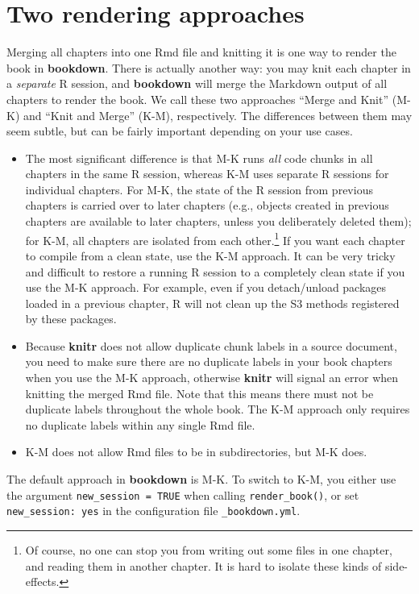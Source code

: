\documentclass[
  12pt,
]{krantz}
\providecommand{\tightlist}{%
  \setlength{\itemsep}{0pt}\setlength{\parskip}{0pt}}
\theoremstyle{definition}
\theoremstyle{definition}
\theoremstyle{definition}
\theoremstyle{definition}
\theoremstyle{remark}
\begin{document}
\section{Two rendering approaches}\label{new-session}

Merging all chapters into one Rmd file and knitting it is one way to render the book in \textbf{bookdown}. There is actually another way: you may knit each chapter in a \emph{separate} R session, and \textbf{bookdown} will merge the Markdown output of all chapters to render the book. We call these two approaches ``Merge and Knit'' (M-K) and ``Knit and Merge'' (K-M), respectively. The differences between them may seem subtle, but can be fairly important depending on your use cases.

\begin{itemize}
\tightlist
\item
  The most significant difference is that M-K runs \emph{all} code chunks in all chapters in the same R session, whereas K-M uses separate R sessions for individual chapters. For M-K, the state of the R session from previous chapters is carried over to later chapters (e.g., objects created in previous chapters are available to later chapters, unless you deliberately deleted them); for K-M, all chapters are isolated from each other.\footnote{Of course, no one can stop you from writing out some files in one chapter, and reading them in another chapter. It is hard to isolate these kinds of side-effects.} If you want each chapter to compile from a clean state, use the K-M approach. It can be very tricky and difficult to restore a running R session to a completely clean state if you use the M-K approach. For example, even if you detach/unload packages loaded in a previous chapter, R will not clean up the S3 methods registered by these packages.
\item
  Because \textbf{knitr} does not allow duplicate chunk labels in a source document, you need to make sure there are no duplicate labels in your book chapters when you use the M-K approach, otherwise \textbf{knitr} will signal an error when knitting the merged Rmd file. Note that this means there must not be duplicate labels throughout the whole book. The K-M approach only requires no duplicate labels within any single Rmd file.
\item
  K-M does not allow Rmd files to be in subdirectories, but M-K does.
\end{itemize}

The default approach in \textbf{bookdown} is M-K. To switch to K-M, you either use the argument \texttt{new\_session\ =\ TRUE} when calling \texttt{render\_book()}, or set \texttt{new\_session:\ yes} in the configuration file \texttt{\_bookdown.yml}.
\end{document}
